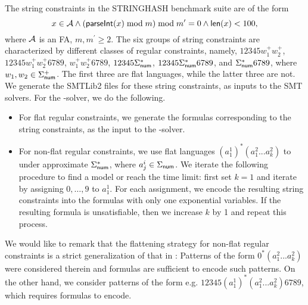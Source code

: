 The string constraints in the STRINGHASH benchmark suite are of the form 
$$x \in \mathcal{A} \wedge \left( \textsf{parseInt}(x) \bmod m \right) \bmod m^\prime = 0   \notag \wedge \textsf{len}(x) < 100,$$ 
where $\mathcal{A}$ is an FA, $m, m^\prime \ge 2.$ 
The six groups of string constraints are characterized by different classes of regular constraints, namely, $12345w^+_1 w^+_2$,  $12345 w^+_1  w^+_2 6789$, $w^+_1 w^+_2 6789$, $12345\Sigma_{\sf num}^*$, $12345\Sigma_{\sf num}^* 6789$, and $\Sigma_{\sf num}^* 6789$, where $w_1,w_2 \in \Sigma^+_{\sf num}$. The first three are flat languages, while the latter three are not. We generate the SMTLib2 files for these string constraints, as inputs to the SMT solvers. For the {\paexp}-solver, we do the following.   
\begin{itemize}
\item For flat regular constraints, we generate the {\paexp} formulas corresponding to the string constraints, as the input to the {\paexp}-solver.
%
\item For non-flat regular constraints, we use flat languages $(a^1_1)^* (a^2_1...a^2_k)$ to under approximate 
$\Sigma_{\sf num}^*$,  where $a^i_j \in \Sigma_{\sf num}$. 
%
%
We iterate the following procedure to find a model or reach the time limit: first set $k=1$ and iterate by assigning $0, \ldots, 9$ to $a^1_1$. For each assignment, we encode the resulting string constraints into the {\paexp} formulas with only one exponential variables. If the resulting {\paexp} formula is unsatisfiable, then we increase $k$ by 1 and repeat this process. 
\end{itemize}
We would like to remark that the flattening strategy for non-flat regular constraints is a strict generalization of that in \cite{Parosh:20:PLDI}: Patterns of the form $0^*(a^2_1...a^2_k)$ were considered therein and {\pa} formulas are sufficient to encode such patterns. On the other hand, we consider patterns of the form e.g. $12345 (a^1_1)^* (a^2_1...a^2_k) 6789$, which requires {\paexp} formulas to encode.


